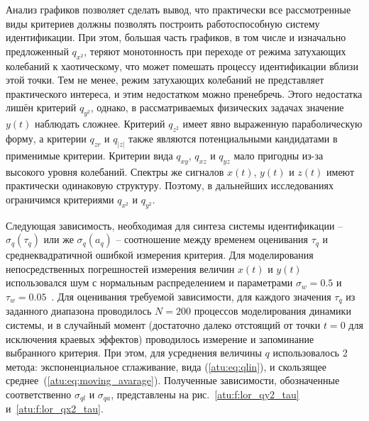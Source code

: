 Анализ графиков позволяет сделать вывод, что практически все
рассмотренные виды критериев должны позволять построить
работоспособную систему идентификации. При этом,
большая часть графиков, в том числе и изначально
предложенный $q_{x^2}$, теряют монотонность
при переходе от режима затухающих колебаний к хаотическому,
что может помешать процессу идентификации вблизи этой точки.
Тем не менее, режим затухающих колебаний не представляет
практического интереса, и этим недостатком можно пренебречь.
Этого недостатка лишён критерий $q_{y^2}$, однако,
в рассматриваемых физических задачах значение
$y(t)$ наблюдать сложнее.
Критерий $q_{z^2}$ имеет явно выраженную параболическую форму,
а критерии $q_{zr}$ и $q_{|z|}$ также являются потенциальными кандидатами
в применимые критерии.
Критерии вида $q_{xy}$, $q_{xz}$ и $q_{yz}$
мало пригодны из-за высокого уровня колебаний.
Спектры же сигналов $x(t)$, $y(t)$ и $z(t)$
имеют практически одинаковую структуру.
Поэтому, в дальнейших исследованиях ограничимся
критериями
$q_{x^2}$ и
$q_{y^2}$.

Следующая зависимость, необходимая для синтеза
системы идентификации -- $ \sigma_q(\tau_q) $
или же  $ \sigma_q(a_q) $ -- соотношение между
временем оценивания $\tau_q$ и среднеквадратичной
ошибкой измерения критерия.
Для моделирования непосредственных погрешностей измерения величин
$x(t)$ и $y(t)$ использовался шум с нормальным распределением
и параметрами $\sigma_w=0.5$ и $\tau_w=0.05$~\cite{atu_asau26}.
Для оценивания требуемой зависимости, для каждого
значения $\tau_q$ из заданного диапазона
проводилось $N=200$ процессов моделирования динамики системы,
и в случайный момент (достаточно далеко отстоящий от точки $t=0$ для исключения краевых эффектов)
проводилось измерение и запоминание выбранного критерия.
При этом, для усреднения величины $q$ использовалось 2 метода:
экспоненциальное сглаживание, вида (\ref{atu:eq:qlin}), и скользящее среднее~(\ref{atu:eq:moving_avarage}).
Полученные зависимости, обозначенные соответственно
$\sigma_{ql}$ и $\sigma_{qa}$, представлены на
рис.~\ref{atu:f:lor_qy2_tau} и~\ref{atu:f:lor_qx2_tau}.


